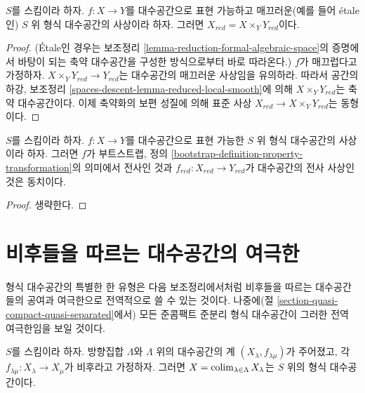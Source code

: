 \begin{lemma}
\label{lemma-reduction-smooth}
$S$를 스킴이라 하자. $f : X \to Y$를 대수공간으로 표현 가능하고
매끄러운(예를 들어 \'etale인) $S$ 위 형식 대수공간의 사상이라 하자.
그러면 $X_{red} = X \times_Y Y_{red}$이다.
\end{lemma}

\begin{proof}
(\'Etale인 경우는 보조정리
\ref{lemma-reduction-formal-algebraic-space}의 증명에서 바탕이 되는
축약 대수공간을 구성한 방식으로부터 바로 따라온다.) $f$가
매끄럽다고 가정하자. $X \times_Y Y_{red} \to Y_{red}$는
대수공간의 매끄러운 사상임을 유의하라. 따라서 공간의 하강, 보조정리
\ref{spaces-descent-lemma-reduced-local-smooth}에 의해
$X \times_Y Y_{red}$는 축약 대수공간이다. 이제 축약화의 보편
성질에 의해 표준 사상 $X_{red} \to X \times_Y Y_{red}$는
동형이다.
\end{proof}

\begin{lemma}
\label{lemma-reduction-surjective}
$S$를 스킴이라 하자. $f : X \to Y$를 대수공간으로 표현 가능한
$S$ 위 형식 대수공간의 사상이라 하자. 그러면 $f$가 부트스트랩,
정의 \ref{bootstrap-definition-property-transformation}의 의미에서
전사인 것과 $f_{red} : X_{red} \to Y_{red}$가 대수공간의 전사
사상인 것은 동치이다.
\end{lemma}

\begin{proof}
생략한다.
\end{proof}

\section{비후들을 따르는 대수공간의 여극한}
\label{section-global-colimits}

\noindent
형식 대수공간의 특별한 한 유형은 다음 보조정리에서처럼 비후들을
따르는 대수공간들의 공여과 여극한으로 전역적으로 쓸 수 있는
것이다. 나중에(절
\ref{section-quasi-compact-quasi-separated}에서) 모든 준콤팩트
준분리 형식 대수공간이 그러한 전역 여극한임을 보일 것이다.

\begin{lemma}
\label{lemma-colimit-is-formal}
$S$를 스킴이라 하자. 방향집합 $\Lambda$와 $\Lambda$ 위의 대수공간의 계
$(X_\lambda, f_{\lambda \mu})$가 주어졌고, 각
$f_{\lambda \mu} : X_\lambda \to X_\mu$가 비후라고 가정하자.
그러면 $X = \mathop{\mathrm{colim}}\nolimits_{\lambda \in \Lambda} X_\lambda$는 $S$ 위의
형식 대수공간이다.
\end{lemma}

